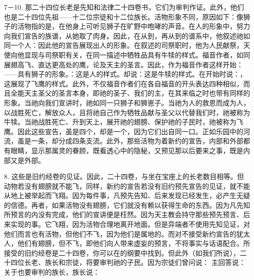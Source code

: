 7－10.  那二十四位长老是先知和法律二十四卷书，它们为审判作证。此外，他们也是二十四位先祖——十二位宗徒和十二位族长。活物形象不同，原因如下：像狮子的活物指的是，在他身上可听见狮子在旷野中咆哮的声音。在人的形象中，努力向我们宣告的族谱，从她取了肉身。因此，在从到，再从到的谱系中，他叙述祂如同一个人：因此他的宣告展现出人的形象。在叙述的司祭职时，他为人民献祭，天使向他显现与司祭职有关，在同一描述中牺牲品具有牛犊的样式。福音作者，如同展翅高飞、直达更高处的鹰，论及天主的圣言。因此，作为福音作者这样开始： ——具有狮子的形象。：这是人的样式。却说：这是牛犊的样式。在开始时说：，这展现了飞鹰的样式。此外，不仅福音作者们在各自福音的开头表达四种相似，而且全能天主圣父的圣言本身，即祂的圣子、我们的主，在其来临之时也带有同样的形象。当祂向我们宣讲时，祂如同一只狮子和狮崽子。当祂为人的救恩而成为人，以战胜死亡，解放众人，且将祂自己作为牺牲品献与圣父以代替我们时，祂被称为牛犊。当祂战胜死亡、升到天上，展开祂的翅膀、保护祂的子民时，祂被称为飞鹰。因此这些宣告，虽是四个，却是一个，因为它们出自同一口。正如乐园中的河流，虽是一条，却分成四条支流。此外，那些活物为着新约的宣告，内部和外部都有眼睛，显示那属灵的眷顾，既看透心中的隐秘，又预见那以后要来之事，既是内部又是外部。\par

8.  这些是旧约经卷的见证。因此，二十四卷，与坐在宝座上的长老数目相等。但动物若没有翅膀就不能飞，同样，新约的宣告若没有旧约预先宣告的见证，就不能从地上被举起而飞翔。因为每件事，凡预先告知、后来发现已经发生，必产生无疑的信德。再者，如果活物没有翅膀，它们就没有赖以获得生命的东西。因为凡先知所预言的内没有完成，他们的宣讲便是枉然。因为天主教会持守那些预先预言、后来实现的事。它飞翔，因为活物合理地离开地面。但是异端者不使用先知见证，对他们而言也有活物，但他们不飞，因为他们是属地的。而对不接受新约宣告的犹太人，他们有翅膀，但不飞，即他们向人带来虚妄的预言，不将事实与话语配合。所接受的旧约经卷是二十四卷，你可以在的纲要中找到。但此外（如我们所说），二十四位长老、族长和宗徒，将要审判祂的子民。因为宗徒们曾问说： 主回答说：关于也要审判的族长，族长说：\par

